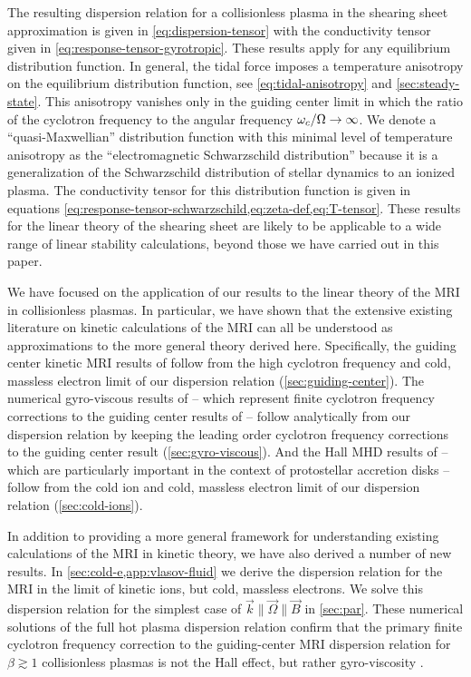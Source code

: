 \documentclass[aps,pre,notitlepage,amsmath,amssymb,amsfonts,nobibnotes,nofootinbib,superscriptaddress]{revtex4-1}
\begin{document}
The resulting dispersion relation for a collisionless plasma in the shearing
sheet approximation is given in \cref{eq:dispersion-tensor} with the
conductivity tensor given in \cref{eq:response-tensor-gyrotropic}. These
results apply for any equilibrium distribution function. In general, the tidal
force imposes a temperature anisotropy on the equilibrium distribution
function, see \cref{eq:tidal-anisotropy} and \cref{sec:steady-state}. This
anisotropy vanishes only in the guiding center limit in which the ratio of the
cyclotron frequency to the angular frequency $\omega_c/\Omega\rightarrow\infty$.
We denote a ``quasi-Maxwellian'' distribution function with this minimal level
of temperature anisotropy as the ``electromagnetic Schwarzschild
distribution'' because it is a generalization of the Schwarzschild
distribution of stellar dynamics to an ionized plasma. The conductivity tensor
for this distribution function is given in equations
\cref{eq:response-tensor-schwarzschild,eq:zeta-def,eq:T-tensor}. These results
for the linear theory of the shearing sheet are likely to be applicable to a
wide range of linear stability calculations, beyond those we have carried out
in this paper. 

We have focused on the application of our results to the linear theory of the
MRI in collisionless plasmas. In particular, we have shown that the extensive
existing literature on kinetic calculations of the MRI can all be understood
as approximations to the more general theory derived here. Specifically, the
guiding center kinetic MRI results of \citet{Quataert2002} follow from the
high cyclotron frequency and cold, massless electron limit of our dispersion
relation (\cref{sec:guiding-center}). The numerical gyro-viscous results of
\citet{Ferraro2007} -- which represent finite cyclotron frequency corrections
to the guiding center results of \citet{Quataert2002} -- follow analytically
from our dispersion relation by keeping the leading order cyclotron frequency
corrections to the guiding center result (\cref{sec:gyro-viscous}). And the
Hall MHD results of \citet{Wardle1999} -- which are particularly important in
the context of protostellar accretion disks -- follow from the cold ion and
cold, massless electron limit of our dispersion relation
(\cref{sec:cold-ions}).

In addition to providing a more general framework for understanding existing
calculations of the MRI in kinetic theory, we have also derived a number of
new results. In \cref{sec:cold-e,app:vlasov-fluid} we derive the dispersion
relation for the MRI in the limit of kinetic ions, but cold, massless
electrons. We solve this dispersion relation for the simplest case of
$\vec{k}\parallel\vec{\Omega}\parallel\vec{B}$ in \cref{sec:par}. These
numerical solutions of the full hot plasma dispersion relation confirm that
the primary finite cyclotron frequency correction to the guiding-center MRI
dispersion relation for $\beta\gtrsim1$ collisionless plasmas is not the Hall
effect, but rather gyro-viscosity \citep{Ferraro2007}.
\end{document}
